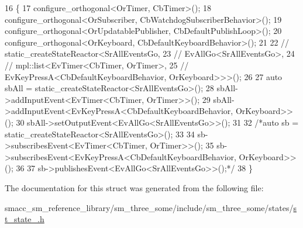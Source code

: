 \begin{DoxyCode}
16     \{
17         configure\_orthogonal<OrTimer, CbTimer>();
18         configure\_orthogonal<OrSubscriber, CbWatchdogSubscriberBehavior>();
19         configure\_orthogonal<OrUpdatablePublisher, CbDefaultPublishLoop>();
20         configure\_orthogonal<OrKeyboard, CbDefaultKeyboardBehavior>();
21 
22         \textcolor{comment}{// static\_createStateReactor<SrAllEventsGo,}
23         \textcolor{comment}{//                        EvAllGo<SrAllEventsGo>,}
24         \textcolor{comment}{//                        mpl::list<EvTimer<CbTimer, OrTimer>,}
25         \textcolor{comment}{//                                  EvKeyPressA<CbDefaultKeyboardBehavior, OrKeyboard>>>();}
26 
27         \textcolor{keyword}{auto} sbAll = static\_createStateReactor<SrAllEventsGo>();
28         sbAll->addInputEvent<EvTimer<CbTimer, OrTimer>>();
29         sbAll->addInputEvent<EvKeyPressA<CbDefaultKeyboardBehavior, OrKeyboard>>();
30         sbAll->setOutputEvent<EvAllGo<SrAllEventsGo>>();
31 
32         \textcolor{comment}{/*auto sb = static\_createStateReactor<SrAllEventsGo>();}
33 \textcolor{comment}{}
34 \textcolor{comment}{        sb->subscribesEvent<EvTimer<CbTimer, OrTimer>>();}
35 \textcolor{comment}{        sb->subscribesEvent<EvKeyPressA<CbDefaultKeyboardBehavior, OrKeyboard>>();}
36 \textcolor{comment}{}
37 \textcolor{comment}{        sb->publishesEvent<EvAllGo<SrAllEventsGo>>();*/}
38     \}
\end{DoxyCode}


The documentation for this struct was generated from the following file\+:\begin{DoxyCompactItemize}
\item 
smacc\+\_\+sm\+\_\+reference\+\_\+library/sm\+\_\+three\+\_\+some/include/sm\+\_\+three\+\_\+some/states/\hyperlink{sm__three__some_2include_2sm__three__some_2states_2st__state__2_8h}{st\+\_\+state\+\_.\+h}\end{DoxyCompactItemize}
